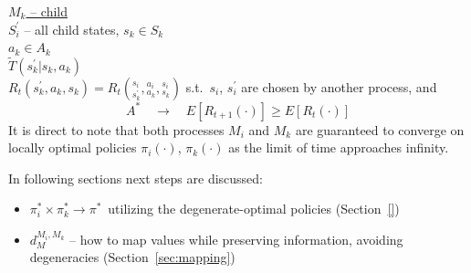 \underline{$M_k$ -- child}\\

$S^\prime_i$ -- all child states, $s_k\in S_k$\\
$a_k\in A_k$\\
$\tilde{T}(s^\prime_k|s_k,a_k)$\\
$R_t(s^\prime_k,a_k,s_k)=R_t\left({}^{s_i}_{s^\prime_k},{}^{a_i}_{a_k},{}^{s_i}_{s_k}\right)$
s.t.\ $s_i$, $s^\prime_i$ are chosen by another process, and
\begin{equation*}
\boxed{A^*}\quad\longrightarrow\quad E[R_{t+1}(\cdot)]\geq E[R_t(\cdot)]
\end{equation*}
It is direct to note that both processes $M_i$ and $M_k$ are guaranteed to converge on locally optimal policies $\pi_i(\cdot)$, $\pi_k(\cdot)$ as the limit of time approaches infinity. 

In following sections next steps are discussed:
\begin{itemize}
\item $\pi^\ast_i \times \pi^\ast_k \to \pi^\ast${\ }utilizing the degenerate-optimal policies (Section~\ref{})
\item $d^{M_i, M_k}_{M}$ -- how to map values while preserving information, avoiding degeneracies (Section~\ref{sec:mapping})
\end{itemize}
